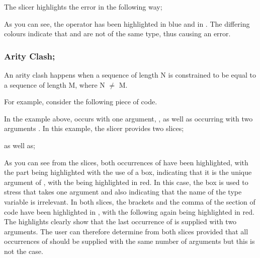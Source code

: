 \documentclass{article}
\begin{document}
\begin{itemize}
The slicer highlights the error in the following way;


As you can see, the \incodebody{+} operator has been highlighted in blue and
 in \tesEndPointOne. The differing colours indicate that
 and \incodebody{+} are not of the same type,
thus causing an error.

\newpage


\subsubsection{Arity Clash;}

  \subitem An arity clash happens when a sequence of length N is
  constrained to be equal to a sequence of length M, where N $\neq$ M.


For example, consider the following piece of code.


In the example above,  occurs with one argument,
, as well as occurring with two arguments
. In this example, the slicer provides two
slices;


as well as;


As you can see from the slices, both occurrences of  have been highlighted, with the  part being
highlighted with the use of a box, indicating that it is the unique
argument of , with the  being
highlighted in red. In this case, the box is used to stress that
 takes one argument and also indicating that the name
of the type variable  is irrelevant. In both slices,
the brackets and the comma of the section of code  have been highlighted in \tesEndPointOne, with the following
 again being highlighted in red. The \tesEndPointOne highlights
clearly show that the last occurrence of  is supplied
with two arguments. The user can therefore determine from both slices
provided that all occurrences of  should be supplied
with the same number of arguments but this is not the case.


\end{itemize}
\end{document}

